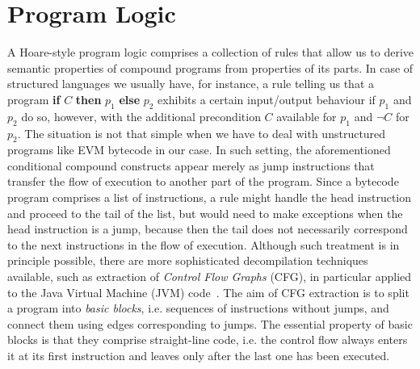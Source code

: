 \documentclass[sigplan,10pt,review]{acmart}\settopmatter{printfolios=true,printccs=false,printacmref=false}
\begin{document}
\section{Program Logic}
\label{sec:logic}
A Hoare-style program logic comprises a collection of rules that allow us to derive semantic properties 
of compound programs from properties of its parts. In case of structured languages 
we usually have, for instance, a rule telling us that a program \textbf{if} $C$ \textbf{then} $p_1$ \textbf{else} $p_2$
exhibits a certain input/output behaviour if $p_1$ and $p_2$ do so, however, with the additional precondition $C$ 
available for $p_1$ and $\neg C$ for $p_2$.
The situation is not that simple when we have to deal with
unstructured programs like EVM bytecode in our case.
In such setting, the aforementioned conditional compound constructs
appear merely as jump instructions that transfer the flow of execution
to another part of the program.
Since a bytecode program comprises
a list of instructions, a rule might handle the head instruction and proceed to the tail of 
the list, but would need to make exceptions when the head instruction is a jump, because then
the tail does not necessarily correspond to the next instructions in the flow of execution.
Although such treatment is in principle possible,
there are more sophisticated decompilation techniques available, such as extraction of 
\emph{Control Flow Graphs} (CFG), in particular applied to the Java Virtual Machine (JVM) code~\cite{zhao99}.
The aim of CFG extraction is to split a program into \emph{basic blocks}, i.e. sequences of
instructions without jumps, and connect them
using edges corresponding to jumps.
The essential property of basic blocks is that
they comprise straight-line code, i.e. the control flow always enters it at its first instruction
and leaves only after the last one has been executed.
\end{document}
